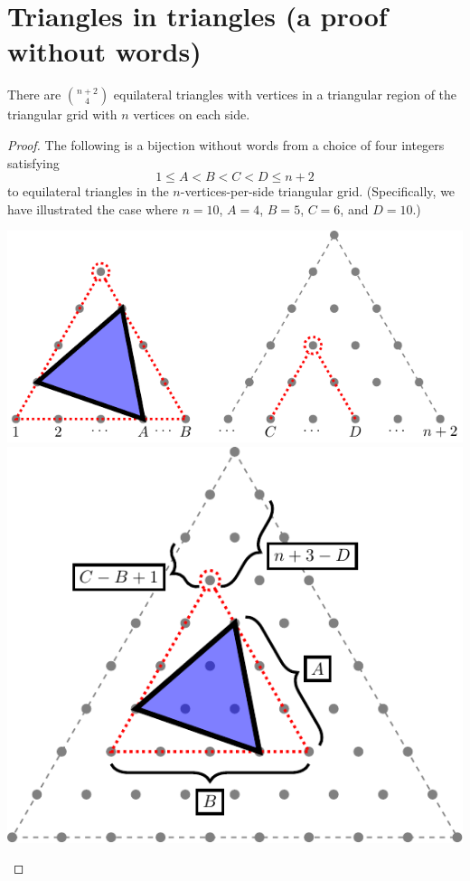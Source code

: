 \chapter{Triangles in triangles (a proof without words)}
\label{cha:TrianglesInTriangles}
\begin{theorem}
There are $\binom{n+2}{4}$ equilateral triangles with vertices in a triangular
region of the triangular grid with $n$ vertices on each side.
\end{theorem}
\begin{proof}
The following is a bijection without words from a choice of four integers
satisfying \[
  1 \leq A < B < C < D \leq n + 2
\]
to equilateral triangles in the $n$-vertices-per-side triangular grid.
(Specifically, we have illustrated the case where
$n = 10$, $A = 4$, $B = 5$, $C=6$, and $D=10$.)

\noindent
\begin{center}
  \includegraphics[scale=1]{figures/TrianglesInTriangles/assets/triangles_in_triangles_subset}
  \\
  \includegraphics[scale=1]{figures/TrianglesInTriangles/assets/triangles_in_triangles}
\end{center}
\end{proof}

